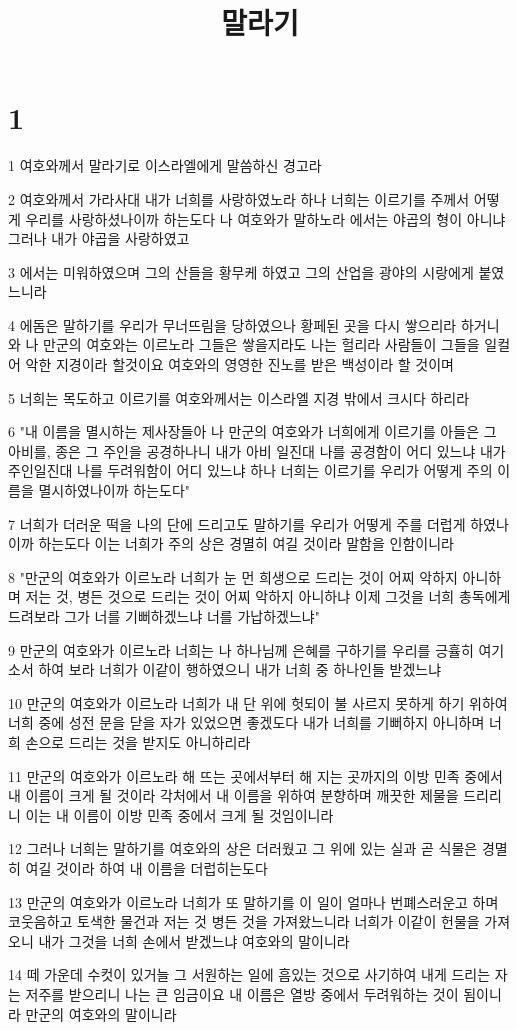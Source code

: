 

\title{말라기}


\chapter{1}

\par 1 여호와께서 말라기로 이스라엘에게 말씀하신 경고라
\par 2 여호와께서 가라사대 내가 너희를 사랑하였노라 하나 너희는 이르기를 주께서 어떻게 우리를 사랑하셨나이까 하는도다 나 여호와가 말하노라 에서는 야곱의 형이 아니냐 그러나 내가 야곱을 사랑하였고
\par 3 에서는 미워하였으며 그의 산들을 황무케 하였고 그의 산업을 광야의 시랑에게 붙였느니라
\par 4 에돔은 말하기를 우리가 무너뜨림을 당하였으나 황페된 곳을 다시 쌓으리라 하거니와 나 만군의 여호와는 이르노라 그들은 쌓을지라도 나는 헐리라 사람들이 그들을 일컬어 악한 지경이라 할것이요 여호와의 영영한 진노를 받은 백성이라 할 것이며
\par 5 너희는 목도하고 이르기를 여호와께서는 이스라엘 지경 밖에서 크시다 하리라
\par 6 "내 이름을 멸시하는 제사장들아 나 만군의 여호와가 너희에게 이르기를 아들은 그 아비를, 종은 그 주인을 공경하나니 내가 아비 일진대 나를 공경함이 어디 있느냐 내가 주인일진대 나를 두려워함이 어디 있느냐 하나 너희는 이르기를 우리가 어떻게 주의 이름을 멸시하였나이까 하는도다"
\par 7 너희가 더러운 떡을 나의 단에 드리고도 말하기를 우리가 어떻게 주를 더럽게 하였나이까 하는도다 이는 너희가 주의 상은 경멸히 여길 것이라 말함을 인함이니라
\par 8 "만군의 여호와가 이르노라 너희가 눈 먼 희생으로 드리는 것이 어찌 악하지 아니하며 저는 것, 병든 것으로 드리는 것이 어찌 악하지 아니하냐 이제 그것을 너희 총독에게 드려보라 그가 너를 기뻐하겠느냐 너를 가납하겠느냐"
\par 9 만군의 여호와가 이르노라 너희는 나 하나님께 은혜를 구하기를 우리를 긍휼히 여기소서 하여 보라 너희가 이같이 행하였으니 내가 너희 중 하나인들 받겠느냐
\par 10 만군의 여호와가 이르노라 너희가 내 단 위에 헛되이 불 사르지 못하게 하기 위하여 너희 중에 성전 문을 닫을 자가 있었으면 좋겠도다 내가 너희를 기뻐하지 아니하며 너희 손으로 드리는 것을 받지도 아니하리라
\par 11 만군의 여호와가 이르노라 해 뜨는 곳에서부터 해 지는 곳까지의 이방 민족 중에서 내 이름이 크게 될 것이라 각처에서 내 이름을 위하여 분향하며 깨끗한 제물을 드리리니 이는 내 이름이 이방 민족 중에서 크게 될 것임이니라
\par 12 그러나 너희는 말하기를 여호와의 상은 더러웠고 그 위에 있는 실과 곧 식물은 경멸히 여길 것이라 하여 내 이름을 더럽히는도다
\par 13 만군의 여호와가 이르노라 너희가 또 말하기를 이 일이 얼마나 번폐스러운고 하며 코웃음하고 토색한 물건과 저는 것 병든 것을 가져왔느니라 너희가 이같이 헌물을 가져오니 내가 그것을 너희 손에서 받겠느냐 여호와의 말이니라
\par 14 떼 가운데 수컷이 있거늘 그 서원하는 일에 흠있는 것으로 사기하여 내게 드리는 자는 저주를 받으리니 나는 큰 임금이요 내 이름은 열방 중에서 두려워하는 것이 됨이니라 만군의 여호와의 말이니라

